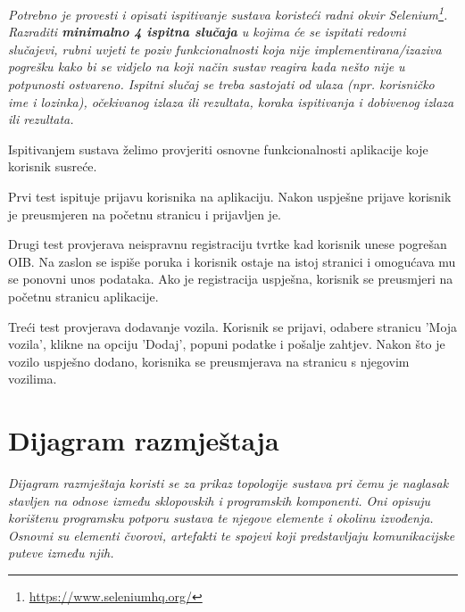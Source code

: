 			 \textit{Potrebno je provesti i opisati ispitivanje sustava koristeći radni okvir Selenium\footnote{\url{https://www.seleniumhq.org/}}. Razraditi \textbf{minimalno 4 ispitna slučaja} u kojima će se ispitati redovni slučajevi, rubni uvjeti te poziv funkcionalnosti koja nije implementirana/izaziva pogrešku kako bi se vidjelo na koji način sustav reagira kada nešto nije u potpunosti ostvareno. Ispitni slučaj se treba sastojati od ulaza (npr. korisničko ime i lozinka), očekivanog izlaza ili rezultata, koraka ispitivanja i dobivenog izlaza ili rezultata.\\ }
			
			Ispitivanjem sustava želimo provjeriti osnovne funkcionalnosti aplikacije koje korisnik susreće.
			
			Prvi test ispituje prijavu korisnika na aplikaciju. Nakon uspješne prijave korisnik je preusmjeren na početnu stranicu i prijavljen je.
			
			
			
			Drugi test provjerava neispravnu registraciju tvrtke kad korisnik unese pogrešan OIB. Na zaslon se ispiše poruka i korisnik ostaje na istoj stranici i omogućava mu se ponovni unos podataka. Ako je registracija uspješna, korisnik se preusmjeri na početnu stranicu aplikacije.
			
			
			Treći test provjerava dodavanje vozila. Korisnik se prijavi, odabere stranicu 'Moja vozila', klikne na opciju 'Dodaj', popuni podatke i pošalje zahtjev. Nakon što je vozilo uspješno dodano, korisnika se preusmjerava na stranicu s njegovim vozilima.
			
			\eject 
		
		
		\section{Dijagram razmještaja}
			
			
			 \textit{Dijagram razmještaja koristi se za prikaz topologije sustava pri čemu je naglasak stavljen na odnose između sklopovskih i programskih komponenti. Oni opisuju korištenu programsku potporu sustava te njegove elemente i okolinu izvođenja. Osnovni su elementi čvorovi, artefakti te spojevi koji predstavljaju komunikacijske puteve između njih. }
			 
